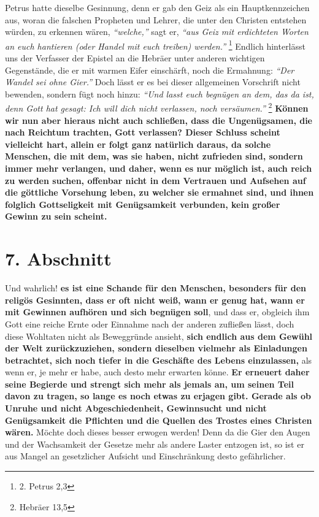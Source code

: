 Petrus  hatte dieselbe Gesinnung, denn er gab den Geiz
als ein Hauptkennzeichen
aus, woran die falschen Propheten und Lehrer,
die unter den Christen entstehen
würden, zu erkennen wären,  \textit{"`welche,"'} sagt er, \textit{"`aus Geiz mit
erdichteten
Worten an euch hantieren (oder Handel mit euch treiben) werden."'}
\footnote{2. Petrus 2,3}
Endlich hinterlässt uns der Verfasser der Epistel an die Hebräer
unter anderen wichtigen Gegenstände, die er mit warmen Eifer einschärft, noch die
Ermahnung: \textit{"`Der Wandel sei ohne Gier."'} Doch lässt er es bei dieser
allgemeinen
Vorschrift nicht bewenden, sondern fügt noch hinzu:
\textit{"`Und lasst euch begnügen an
dem, das da ist, denn Gott hat gesagt: Ich will dich nicht verlassen, noch
versäumen."'}
\footnote{Hebräer 13,5}
 \label{ref:13_06_reichtum_unersaettlichkeit}
\textbf{Können wir nun aber hieraus nicht auch
schließen, dass die Ungenügsamen, die nach
Reichtum trachten, Gott verlassen?
Dieser Schluss scheint vielleicht hart, allein er folgt ganz natürlich daraus, da
solche Menschen, die mit dem, was sie haben, nicht zufrieden sind, sondern immer
mehr verlangen, und daher, wenn es nur möglich ist, auch reich zu werden suchen,
offenbar nicht in dem Vertrauen und Aufsehen auf die göttliche Vorsehung leben,
zu welcher sie ermahnet sind, und ihnen folglich Gottseligkeit mit Genügsamkeit
verbunden, kein großer Gewinn zu sein scheint.}

\section{7. Abschnitt} \label{kap13_ab7}

  Und wahrlich! \textbf{es ist eine
Schande für den Menschen, besonders für den
religös Gesinnten, dass er oft nicht weiß, wann er genug hat, wann er mit Gewinnen
aufhören und sich begnügen soll}, und dass er, obgleich ihm Gott eine reiche
Ernte
oder Einnahme nach der anderen zufließen lässt, doch diese Wohltaten nicht als
Beweggründe ansieht, \label{ref:13_07_reichtum_genuegsamkeit}
\textbf{sich endlich aus dem Gewühl der Welt zurückzuziehen,
sondern dieselben vielmehr als Einladungen betrachtet, sich noch tiefer in die
Geschäfte des Lebens einzulassen,} als wenn er, je mehr er habe, auch desto mehr
erwarten könne. \textbf{Er erneuert daher seine Begierde und strengt sich mehr
als
jemals an, um seinen Teil davon zu tragen, so lange es noch etwas zu erjagen
gibt. Gerade als ob Unruhe und nicht Abgeschiedenheit,
Gewinnsucht und nicht
Genügsamkeit die Pflichten und die Quellen des
Trostes eines Christen wären.}
Möchte doch dieses besser erwogen werden! Denn da die Gier den Augen und der
Wachsamkeit der Gesetze mehr als andere Laster entzogen ist, so ist er aus
 Mangel an gesetzlicher Aufsicht und
Einschränkung desto gefährlicher.

